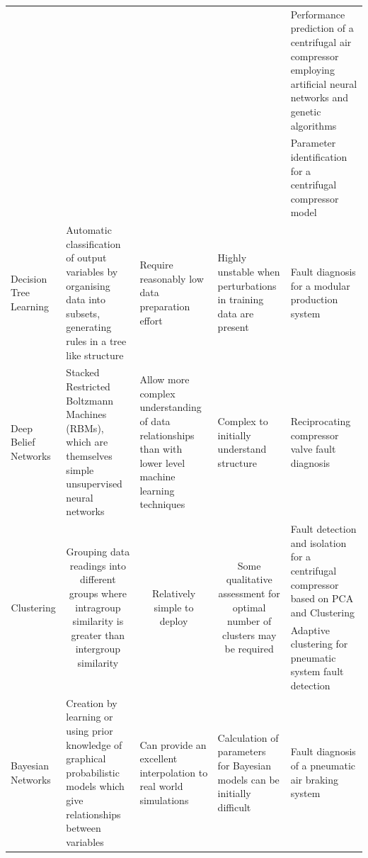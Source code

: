 \begin{center}
\begin{longtable}{p{}p{}p{}p{}p{}}
    \multicolumn{1}{c}{} & \multicolumn{1}{c}{} & \multicolumn{1}{c}{} & \multicolumn{1}{c}{} & Performance prediction of a centrifugal air compressor employing artificial neural networks and genetic algorithms \cite{LuoFangqiong2011}\\
    \multicolumn{1}{c}{} & \multicolumn{1}{c}{} & \multicolumn{1}{c}{} & \multicolumn{1}{c}{} & Parameter identification for a centrifugal compressor model \cite{Xiaogang2013}\\
    \midrule
    Decision Tree Learning & Automatic classification of output variables by organising data into subsets, generating rules in a tree like structure & Require reasonably low data preparation effort & Highly unstable when perturbations in training data are present & Fault diagnosis for a modular production system \cite{Demetgul2013}\\
    \midrule
    Deep Belief Networks & Stacked Restricted Boltzmann Machines (RBMs), which are themselves simple unsupervised neural networks & Allow more complex understanding of data relationships than with lower level machine learning techniques & Complex to initially understand structure & Reciprocating compressor valve fault diagnosis \cite{Tran2014}\\
    \midrule
    \multicolumn{1}{c}{\multirow{2}[0]{.18\textwidth}{Clustering}} & \multicolumn{1}{c}{\multirow{2}[0]{.18\textwidth}{Grouping data readings into different groups where intragroup similarity is greater than intergroup similarity}} & \multicolumn{1}{c}{\multirow{2}[0]{.18\textwidth}{Relatively simple to deploy}} & \multicolumn{1}{c}{\multirow{2}[0]{.18\textwidth}{Some qualitative assessment for optimal number of clusters may be required}} & Fault detection and isolation for a centrifugal compressor based on PCA and Clustering \cite{Zanoli2010}\\
    \multicolumn{1}{c}{} & \multicolumn{1}{c}{} & \multicolumn{1}{c}{} & \multicolumn{1}{c}{} & Adaptive clustering for pneumatic system fault detection \cite{Petkovic2012}\\
    \midrule
    \multirow{2}{.18\textwidth}{Bayesian Networks} & \multirow{2}{.18\textwidth}{Creation by learning or using prior knowledge of graphical probabilistic models which give relationships between variables} & \multirow{2}{.18\textwidth}{Can provide an excellent interpolation to real world simulations} & \multirow{2}{.18\textwidth}{Calculation of parameters for Bayesian models can be initially difficult} & Fault diagnosis of a pneumatic air braking system \cite{Lingling2010}\\

\end{longtable}
\end{center}
